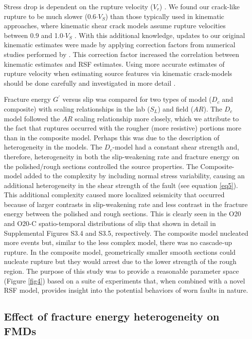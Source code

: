 \documentclass[preprint,1p, 10pt,authoryear]{elsarticle}
\begin{document}
Stress drop is dependent on the rupture velocity ($V_{r}$) \citep{Kaneko2015}. We found our crack-like rupture to be much slower (0.6$\cdot V_{S}$) than those typically used in kinematic approaches, where kinematic shear crack models assume rupture velocities between 0.9 and 1.0$\cdot V_{S}$ \citep{Cocco2016, Selvadurai2019}. With this additional knowledge, updates to our original kinematic estimates were made by applying correction factors from numerical studies performed by \citet{Kaneko2015}. This correction factor increased the correlation between kinematic estimates and RSF estimates. Using more accurate estimates of rupture velocity when estimating source features via kinematic crack-models should be done carefully and investigated in more detail \citep{McGuire2018}.

Fracture energy $G^{'}$ versus slip was compared for two types of model ($D_{c}$ and composite) with scaling relationships in the lab ($S_{L}$) and field ($AR$). The $D_{c}$ model followed the $AR$ scaling relationship more closely, which we attribute to the fact that ruptures occurred with the rougher (more resistive) portions more than in the composite model.  Perhaps this was due to the description of heterogeneity in the models. The $D_{c}$-model had a constant shear strength and, therefore, heterogeneity in both the slip-weakening rate and fracture energy on the polished/rough sections controlled the source properties. The Composite-model added to the complexity by including normal stress variability, causing an additional heterogeneity in the shear strength of the fault (see equation \eqref{eq5}). This additional complexity caused more localized seismicity that occurred because of larger contrasts in slip-weakening rate and less contrast in the fracture energy between the polished and rough sections. This is clearly seen in the O20 and O20-C spatio-temporal distributions of slip that shown in detail in Supplemental Figures S3.4 and S3.5, respectively. The composite model nucleated more events but, similar to the less complex model, there was no cascade-up rupture.  In the composite model, geometrically smaller smooth sections could nucleate rupture but they would arrest due to the lower strength of the rough region. The purpose of this study was to provide a reasonable parameter space (Figure \ref{fig4}) based on a suite of experiments that, when combined with a novel RSF model, provides insight into the potential behaviors of worn faults in nature.

\subsection{Effect of fracture energy heterogeneity on FMDs}
\label{EffectsFMD}
\end{document}

